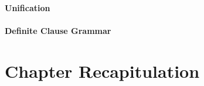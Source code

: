 \documentclass[thesis-solanki.tex]{subfiles}
\begin{document}
\paragraph{Unification}

\paragraph{Definite Clause Grammar}





\section{Chapter Recapitulation}

\ifMain
\begin{scope}
  \nolinenumbers
  \enotesize
  \par
  \begin{singlespace}
  \setlength{\parskip}{12pt plus 2pt minus 1pt}
  \theendnotes
  \par
  \end{singlespace}
\end{scope}
\fi
\end{document}
